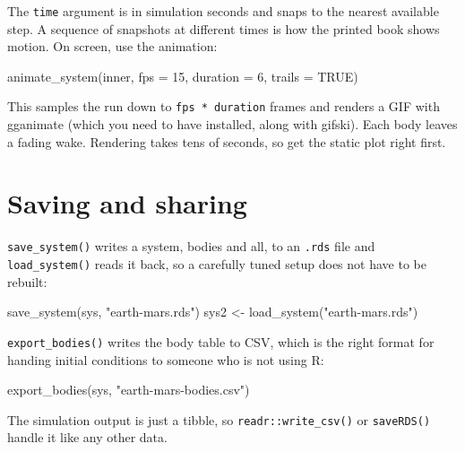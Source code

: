 \documentclass[
  10.5pt,
  letterpaper,
]{scrbook}
\newenvironment{Shaded}{\begin{snugshade}}{\end{snugshade}}
\newcommand{\AttributeTok}[1]{\textcolor[rgb]{0.00,0.00,0.00}{#1}}
\newcommand{\ConstantTok}[1]{\textcolor[rgb]{0.00,0.00,0.00}{#1}}
\newcommand{\DecValTok}[1]{\textcolor[rgb]{0.00,0.00,0.00}{#1}}
\newcommand{\FunctionTok}[1]{\textcolor[rgb]{0.00,0.00,0.00}{#1}}
\newcommand{\NormalTok}[1]{\textcolor[rgb]{0.00,0.00,0.00}{#1}}
\newcommand{\OtherTok}[1]{\textcolor[rgb]{0.00,0.00,0.00}{#1}}
\newcommand{\StringTok}[1]{\textcolor[rgb]{0.00,0.00,0.00}{#1}}
\theoremstyle{plain}
\theoremstyle{remark}
\begin{document}
The \texttt{time} argument is in simulation seconds and snaps to the
nearest available step. A sequence of snapshots at different times is
how the printed book shows motion. On screen, use the animation:

\begin{Shaded}
\begin{Highlighting}[]
\FunctionTok{animate\_system}\NormalTok{(inner, }\AttributeTok{fps =} \DecValTok{15}\NormalTok{, }\AttributeTok{duration =} \DecValTok{6}\NormalTok{, }\AttributeTok{trails =} \ConstantTok{TRUE}\NormalTok{)}
\end{Highlighting}
\end{Shaded}

This samples the run down to \texttt{fps\ *\ duration} frames and
renders a GIF with gganimate (which you need to have installed, along
with gifski). Each body leaves a fading wake. Rendering takes tens of
seconds, so get the static plot right first.

\section{Saving and sharing}\label{saving-and-sharing}

\texttt{save\_system()} writes a system, bodies and all, to an
\texttt{.rds} file and \texttt{load\_system()} reads it back, so a
carefully tuned setup does not have to be rebuilt:

\begin{Shaded}
\begin{Highlighting}[]
\FunctionTok{save\_system}\NormalTok{(sys, }\StringTok{"earth{-}mars.rds"}\NormalTok{)}
\NormalTok{sys2 }\OtherTok{\textless{}{-}} \FunctionTok{load\_system}\NormalTok{(}\StringTok{"earth{-}mars.rds"}\NormalTok{)}
\end{Highlighting}
\end{Shaded}

\texttt{export\_bodies()} writes the body table to CSV, which is the
right format for handing initial conditions to someone who is not using
R:

\begin{Shaded}
\begin{Highlighting}[]
\FunctionTok{export\_bodies}\NormalTok{(sys, }\StringTok{"earth{-}mars{-}bodies.csv"}\NormalTok{)}
\end{Highlighting}
\end{Shaded}

The simulation output is just a tibble, so \texttt{readr::write\_csv()}
or \texttt{saveRDS()} handle it like any other data.
\end{document}
